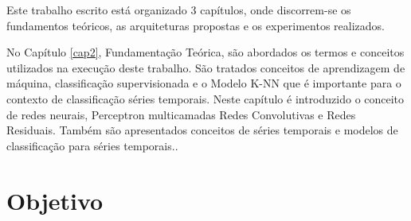 Este trabalho escrito está organizado 3 capítulos, onde discorrem-se os fundamentos teóricos, as arquiteturas propostas e os experimentos realizados.

No Capítulo \ref{cap2}, Fundamentação Teórica, são abordados os termos e conceitos utilizados na execução deste trabalho. São tratados conceitos de aprendizagem de máquina, classificação supervisionada e o Modelo K-NN que é importante para o contexto de classificação séries temporais. Neste capítulo é introduzido o conceito de redes neurais, Perceptron multicamadas Redes Convolutivas e Redes Residuais. Também são apresentados conceitos de séries temporais e modelos de classificação para séries temporais.. 




\section{Objetivo}

